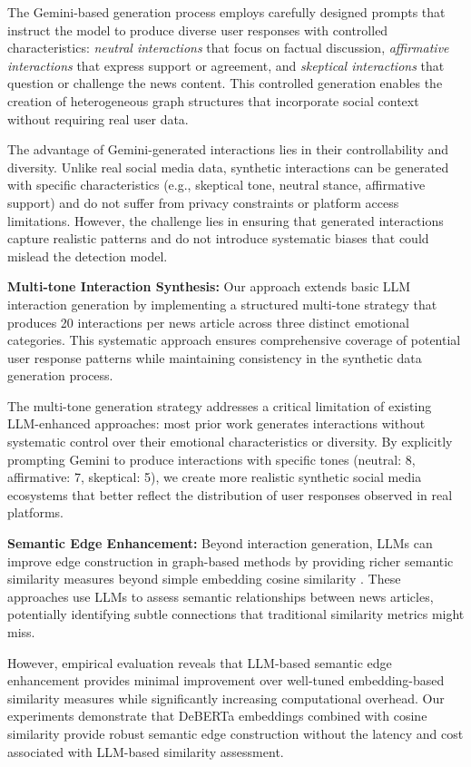 The Gemini-based generation process employs carefully designed prompts that instruct the model to produce diverse user responses with controlled characteristics: \emph{neutral interactions} that focus on factual discussion, \emph{affirmative interactions} that express support or agreement, and \emph{skeptical interactions} that question or challenge the news content. This controlled generation enables the creation of heterogeneous graph structures that incorporate social context without requiring real user data.

The advantage of Gemini-generated interactions lies in their controllability and diversity. Unlike real social media data, synthetic interactions can be generated with specific characteristics (e.g., skeptical tone, neutral stance, affirmative support) and do not suffer from privacy constraints or platform access limitations. However, the challenge lies in ensuring that generated interactions capture realistic patterns and do not introduce systematic biases that could mislead the detection model.

\textbf{Multi-tone Interaction Synthesis:} Our approach extends basic LLM interaction generation by implementing a structured multi-tone strategy that produces 20 interactions per news article across three distinct emotional categories. This systematic approach ensures comprehensive coverage of potential user response patterns while maintaining consistency in the synthetic data generation process.

The multi-tone generation strategy addresses a critical limitation of existing LLM-enhanced approaches: most prior work generates interactions without systematic control over their emotional characteristics or diversity. By explicitly prompting Gemini to produce interactions with specific tones (neutral: 8, affirmative: 7, skeptical: 5), we create more realistic synthetic social media ecosystems that better reflect the distribution of user responses observed in real platforms.

\textbf{Semantic Edge Enhancement:} Beyond interaction generation, LLMs can improve edge construction in graph-based methods by providing richer semantic similarity measures beyond simple embedding cosine similarity \cite{liu2023large, chen2023llm}. These approaches use LLMs to assess semantic relationships between news articles, potentially identifying subtle connections that traditional similarity metrics might miss.

However, empirical evaluation reveals that LLM-based semantic edge enhancement provides minimal improvement over well-tuned embedding-based similarity measures while significantly increasing computational overhead. Our experiments demonstrate that DeBERTa embeddings combined with cosine similarity provide robust semantic edge construction without the latency and cost associated with LLM-based similarity assessment.

